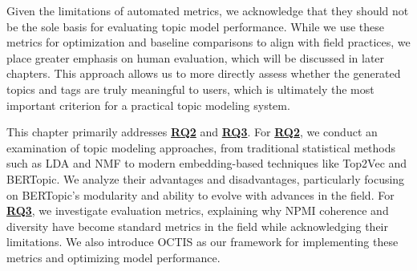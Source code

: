 Given the limitations of automated metrics, we acknowledge that they should not be the sole basis for evaluating topic model performance. While we use these metrics for optimization and baseline comparisons to align with field practices, we place greater emphasis on human evaluation, which will be discussed in later chapters. This approach allows us to more directly assess whether the generated topics and tags are truly meaningful to users, which is ultimately the most important criterion for a practical topic modeling system.

This chapter primarily addresses \hyperref[rq2]{\textbf{RQ2}} and \hyperref[rq3]{\textbf{RQ3}}. For \hyperref[rq2]{\textbf{RQ2}}, we conduct an examination of topic modeling approaches, from traditional statistical methods such as LDA and NMF to modern embedding-based techniques like Top2Vec and BERTopic. We analyze their advantages and disadvantages, particularly focusing on BERTopic's modularity and ability to evolve with advances in the field. For \hyperref[rq3]{\textbf{RQ3}}, we investigate evaluation metrics, explaining why NPMI coherence and diversity have become standard metrics in the field while acknowledging their limitations. We also introduce OCTIS as our framework for implementing these metrics and optimizing model performance.
